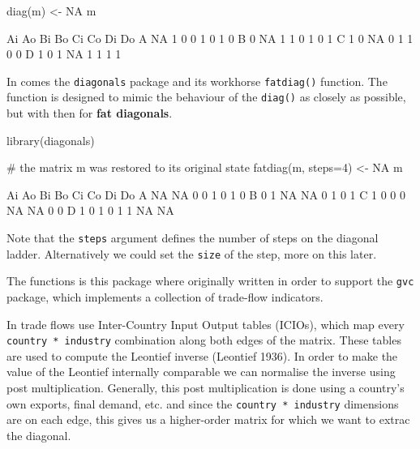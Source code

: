 \documentclass[article]{jss}
\begin{document}
\begin{CodeChunk}
\begin{CodeInput}
diag(m) <- NA
m
\end{CodeInput}
\begin{CodeOutput}
  Ai Ao Bi Bo Ci Co Di Do
A NA  1  0  0  1  0  1  0
B  0 NA  1  1  0  1  0  1
C  1  0 NA  0  1  1  0  0
D  1  0  1 NA  1  1  1  1
\end{CodeOutput}
\end{CodeChunk}

In comes the \texttt{diagonals} package and its workhorse
\texttt{fatdiag()} function. The function is designed to mimic the
behaviour of the \texttt{diag()} as closely as possible, but with then
for \textbf{fat diagonals}.

\begin{CodeChunk}
\begin{CodeInput}
library(diagonals)
\end{CodeInput}
\end{CodeChunk}

\begin{CodeChunk}
\begin{CodeInput}
# the matrix m was restored to its original state
fatdiag(m, steps=4) <- NA
m
\end{CodeInput}
\begin{CodeOutput}
  Ai Ao Bi Bo Ci Co Di Do
A NA NA  0  0  1  0  1  0
B  0  1 NA NA  0  1  0  1
C  1  0  0  0 NA NA  0  0
D  1  0  1  0  1  1 NA NA
\end{CodeOutput}
\end{CodeChunk}

Note that the \texttt{steps} argument defines the number of steps on the
diagonal ladder. Alternatively we could set the \texttt{size} of the
step, more on this later.

The functions is this package where originally written in order to
support the \texttt{gvc} package, which implements a collection of
trade-flow indicators.

In trade flows use Inter-Country Input Output tables (ICIOs), which map
every \texttt{country * industry} combination along both edges of the
matrix. These tables are used to compute the Leontief inverse (Leontief
1936). In order to make the value of the Leontief internally comparable
we can normalise the inverse using post multiplication. Generally, this
post multiplication is done using a country's own exports, final demand,
etc. and since the \texttt{country * industry} dimensions are on each
edge, this gives us a higher-order matrix for which we want to extrac
the diagonal.
\end{document}
